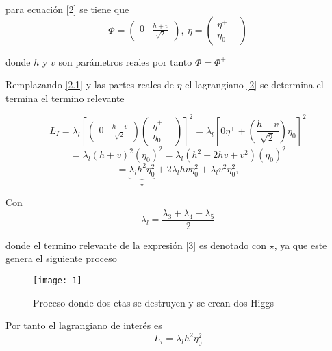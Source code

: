 para ecuación \ref{2} se tiene que 
\begin{equation}
\Phi=\begin{pmatrix}
0 & \frac{h+v}{\sqrt{2}}
\end{pmatrix}, \ \eta= \begin{pmatrix}
\eta^{+} & \\
\eta_{0} & 
\end{pmatrix} 
\label{2.1}
\end{equation}

donde $h$ y $v$ son parámetros reales por tanto $\Phi =\Phi ^{+}$


Remplazando \ref{2.1} y las partes reales de $\eta$ el lagrangiano \ref{2} se determina el termina el termino relevante

\begin{equation*}
L_{I}=\lambda_{l} \left[\begin{pmatrix}
0 & \frac{h+v}{\sqrt{2}}
\end{pmatrix}\begin{pmatrix}
\eta^{+} & \\
\eta_{0} & 
\end{pmatrix}\right]^{2}= \lambda_{l}\left[0\eta^{+}+\left( \frac{h+v}{\sqrt{2}}\right)\eta_{0}\right]^{2}
\end{equation*}
\begin{equation*}
=\lambda_{l}(h+v)^{2}(\eta_{0})^{2}=\lambda_{l}(h^{2}+2hv+v^{2})(\eta_{0})^{2}
\end{equation*}
\begin{equation}
=\underbrace{\lambda_{l}h^{2}\eta_{0}^{2}}_{\star}+2\lambda_{l}hv\eta_{0}^{2}+\lambda_{l}v^{2}\eta_{0}^{2}, 
\label{3}
\end{equation}

Con 
\begin{equation}
\lambda_{l}=\frac{\lambda _{3}+\lambda _{4}+\lambda _{5}}{2}
\end{equation}

donde el termino relevante de la expresión \ref{3} es denotado con $\star$, ya que este genera el siguiente proceso 

\begin{figure*}[htb]
    \centering
    \texttt{[image: 1]}%
    \caption[electrones]{Proceso donde dos etas se destruyen y se crean dos Higgs}
    \label{fi}
\end{figure*}
 



Por tanto el lagrangiano de interés es
\begin{equation}
L_{i}=\lambda_{l}h^{2}\eta_{0}^{2}
\label{4}
\end{equation}










